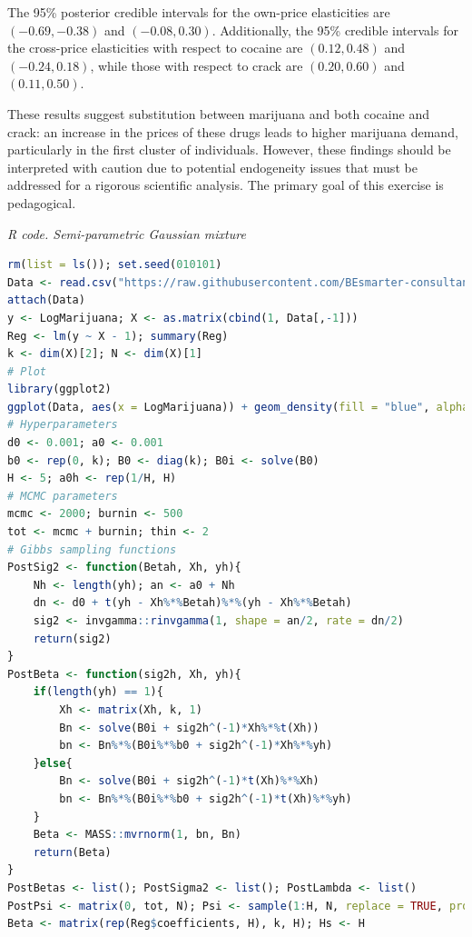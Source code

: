 \begin{enumerate}[leftmargin=*]
The 95\% posterior credible intervals for the own-price elasticities are $(-0.69, -0.38)$ and $(-0.08, 0.30)$. Additionally, the 95\% credible intervals for the cross-price elasticities with respect to cocaine are $(0.12, 0.48)$ and $(-0.24, 0.18)$, while those with respect to crack are $(0.20, 0.60)$ and $(0.11, 0.50)$.  

These results suggest substitution between marijuana and both cocaine and crack: an increase in the prices of these drugs leads to higher marijuana demand, particularly in the first cluster of individuals. However, these findings should be interpreted with caution due to potential endogeneity issues that must be addressed for a rigorous scientific analysis. The primary goal of this exercise is pedagogical.  
 

\begin{tcolorbox}[enhanced,width=4.67in,center upper,
	fontupper=\large\bfseries,drop shadow southwest,sharp corners]
	\textit{R code. Semi-parametric Gaussian mixture}
	\begin{VF}
		\begin{lstlisting}[language=R]
rm(list = ls()); set.seed(010101)
Data <- read.csv("https://raw.githubusercontent.com/BEsmarter-consultancy/BSTApp/refs/heads/master/DataApp/MarijuanaColombia.csv")
attach(Data)
y <- LogMarijuana; X <- as.matrix(cbind(1, Data[,-1]))
Reg <- lm(y ~ X - 1); summary(Reg)
k <- dim(X)[2]; N <- dim(X)[1]
# Plot
library(ggplot2)
ggplot(Data, aes(x = LogMarijuana)) + geom_density(fill = "blue", alpha = 0.3) + labs(title = "Density Plot", x = "y", y = "Density") + theme_minimal()
# Hyperparameters
d0 <- 0.001; a0 <- 0.001
b0 <- rep(0, k); B0 <- diag(k); B0i <- solve(B0)
H <- 5; a0h <- rep(1/H, H)
# MCMC parameters
mcmc <- 2000; burnin <- 500
tot <- mcmc + burnin; thin <- 2
# Gibbs sampling functions
PostSig2 <- function(Betah, Xh, yh){
	Nh <- length(yh); an <- a0 + Nh
	dn <- d0 + t(yh - Xh%*%Betah)%*%(yh - Xh%*%Betah)
	sig2 <- invgamma::rinvgamma(1, shape = an/2, rate = dn/2)
	return(sig2)
}
PostBeta <- function(sig2h, Xh, yh){
	if(length(yh) == 1){
		Xh <- matrix(Xh, k, 1)
		Bn <- solve(B0i + sig2h^(-1)*Xh%*%t(Xh))
		bn <- Bn%*%(B0i%*%b0 + sig2h^(-1)*Xh%*%yh)
	}else{
		Bn <- solve(B0i + sig2h^(-1)*t(Xh)%*%Xh)
		bn <- Bn%*%(B0i%*%b0 + sig2h^(-1)*t(Xh)%*%yh)
	}
	Beta <- MASS::mvrnorm(1, bn, Bn)
	return(Beta)
}
PostBetas <- list(); PostSigma2 <- list(); PostLambda <- list()
PostPsi <- matrix(0, tot, N); Psi <- sample(1:H, N, replace = TRUE, prob = a0h)
Beta <- matrix(rep(Reg$coefficients, H), k, H); Hs <- H
\end{lstlisting}
	\end{VF}
\end{tcolorbox}


\end{enumerate}
